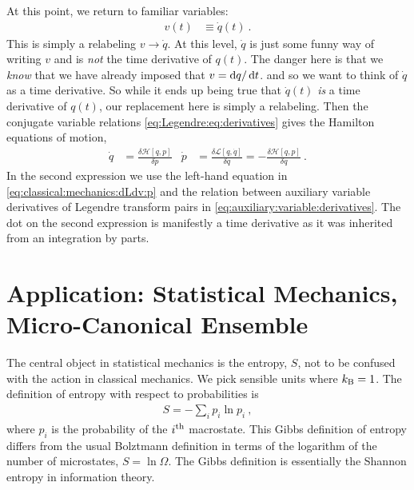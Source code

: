 At this point, we return to familiar variables:
\begin{align}
    v(t) &\equiv \dot q (t) \ .
\end{align}
This is simply a relabeling $v \to \dot q$. At this level, $\dot q$ is just some funny way of writing $v$ and is \emph{not} the time derivative of $q(t)$. The danger here is that we \emph{know} that we have already imposed that $v = \operatorname{d}\mkern-3mu^{}\mkern-1mu{q}/\operatorname{d}\mkern-3mu^{}\mkern-1mu{t}$. and so we want to think of $\dot q$ as a time derivative. So while it ends up being true that $\dot q(t)$ \emph{is} a time derivative of $q(t)$, our replacement here is simply a relabeling. Then the conjugate variable relations \eqref{eq:Legendre:eq:derivatives} gives the Hamilton equations of motion,
\begin{align}
    \dot q &= \frac{\delta \mathcal H[q,p]}{\delta p}
    &
    \dot p &= \frac{\delta \mathcal L[q,\dot q]}{\delta q}
    = 
    -\frac{\delta \mathcal H[q,p]}{\delta q} \ .
\end{align}
In the second expression we use the left-hand equation in \eqref{eq:classical:mechanics:dLdv:p} and the relation between auxiliary variable derivatives of Legendre transform pairs in \eqref{eq:auxiliary:variable:derivatives}. The dot on the second expression is manifestly a time derivative as it was inherited from an integration by parts. 


\section{Application: Statistical Mechanics, Micro-Canonical Ensemble}

The central object in statistical mechanics is the entropy, $S$, not to be confused with the action in classical mechanics. We pick sensible units where $k_\textnormal{B} = 1$. The definition of entropy with respect to probabilities is
\begin{align}
    S = -\sum_i p_i \ln p_i \ ,
\end{align}
where $p_i$ is the probability of the $i^\textnormal{th}$ macrostate. This Gibbs definition of entropy differs from the usual Bolztmann definition in terms of the logarithm of the number of microstates, $S = \ln \Omega$. The Gibbs definition is essentially the Shannon entropy in information theory.

